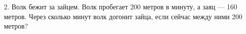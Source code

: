2. Волк бежит за зайцем. Волк пробегает 200 метров в минуту, а заяц --- 160 метров. Через сколько минут волк догонит зайца, если сейчас между ними 200 метров?\\
